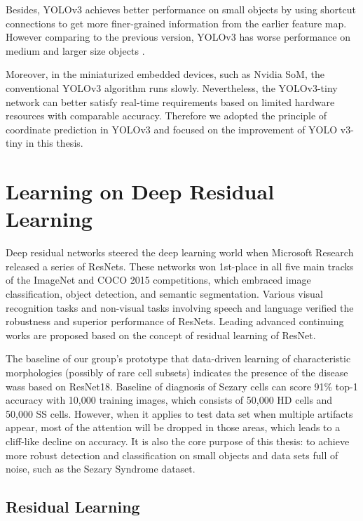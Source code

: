 Besides, YOLOv3 \cite{33} achieves better performance on small objects by using shortcut connections to get more ﬁner-grained information from the earlier feature map. However comparing to the previous version, YOLOv3 has worse performance on medium and larger size objects \cite{33}.

Moreover, in the miniaturized embedded devices, such as Nvidia SoM, the conventional YOLOv3 algorithm runs slowly\cite{18}. Nevertheless, the YOLOv3-tiny network can better satisfy real-time requirements based on limited hardware resources with comparable accuracy. Therefore we adopted the principle of coordinate prediction in YOLOv3\cite{33} and focused on the improvement of YOLO v3-tiny in this thesis.

\section{Learning on Deep Residual Learning}

Deep residual networks \cite{20} steered the deep learning world when Microsoft Research released a series of ResNets. These networks won 1st-place  in all five main tracks of the ImageNet and COCO 2015 competitions, which embraced image classification, object detection, and semantic segmentation\cite{20}. Various visual recognition tasks and non-visual tasks involving speech and language verified the robustness and superior performance of ResNets. Leading advanced continuing works are proposed based on the concept of residual learning of ResNet\cite{20}.

The baseline of our group's prototype that data-driven learning of characteristic morphologies (possibly of rare cell subsets) indicates the presence of the disease wass based on ResNet18\cite{20}. 
Baseline of diagnosis of Sezary cells can score 91\% top-1 accuracy with 10,000 training images, which consists of 50,000 HD cells and  50,000 SS cells. However, when it applies to test data set when multiple artifacts appear, most of the attention will be dropped in those areas, which leads to a cliff-like decline on accuracy. It is also the core purpose of this thesis: to achieve more robust detection and classification on small objects and data sets full of noise, such as the Sezary Syndrome dataset.


\subsection{ Residual Learning }

